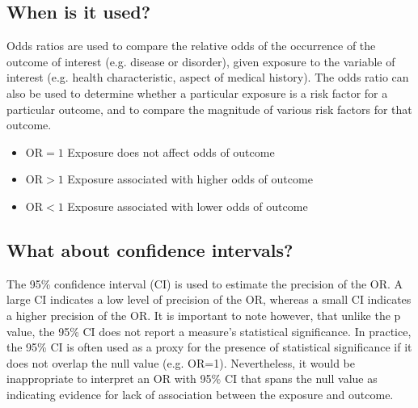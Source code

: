 \documentclass[]{report}
\begin{document}
\subsection{When is it used?}
Odds ratios are used to compare the relative odds of the occurrence of the outcome of interest (e.g. disease or disorder), given exposure to the variable of interest (e.g. health characteristic, aspect of medical history). The odds ratio can also be used to determine whether a particular exposure is a risk factor for a particular outcome, and to compare the magnitude of various risk factors for that outcome.

\begin{itemize}
\item OR$=1$ Exposure does not affect odds of outcome
\item OR$>1$ Exposure associated with higher odds of outcome
\item OR$<1$ Exposure associated with lower odds of outcome
\end{itemize}

\subsection{What about confidence intervals?}
The 95\% confidence interval (CI) is used to estimate the precision of the OR. A large CI indicates a low level of precision of the OR, whereas a small CI indicates a higher precision of the OR. It is important to note however, that unlike the p value, the 95\% CI does not report a measure’s statistical significance. In practice, the 95\% CI is often used as a proxy for the presence of statistical significance if it does not overlap the null value (e.g. OR=1). Nevertheless, it would be inappropriate to interpret an OR with 95\% CI that spans the null value as indicating evidence for lack of association between the exposure and outcome.
\end{document}
